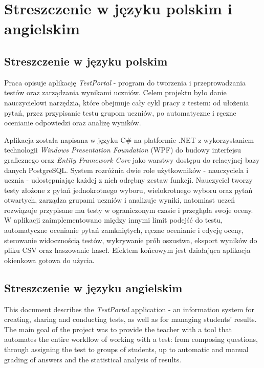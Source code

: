 ﻿\chapter{Streszczenie w języku polskim i angielskim}
\label{cha:streszczenie}

\section{Streszczenie w języku polskim}
\label{sec:streszczeniePL}

Praca opisuje aplikację \emph{TestPortal} - program do tworzenia i przeprowadzania testów oraz
zarządzania wynikami uczniów. Celem projektu było danie nauczycielowi narzędzia, które obejmuje cały
cykl pracy z testem: od ułożenia pytań, przez przypisanie testu grupom uczniów, po automatyczne
i ręczne ocenianie odpowiedzi oraz analizę wyników.

Aplikacja została napisana w języku C\# na platformie .NET z wykorzystaniem technologii
\emph{Windows Presentation Foundation} (WPF) do budowy interfejsu graficznego oraz \emph{Entity
Framework Core} jako warstwy dostępu do relacyjnej bazy danych PostgreSQL. System rozróżnia dwie
role użytkowników - nauczyciela i ucznia - udostępniając każdej z nich odrębny zestaw funkcji.
Nauczyciel tworzy testy złożone z pytań jednokrotnego wyboru, wielokrotnego wyboru oraz pytań
otwartych, zarządza grupami uczniów i analizuje wyniki, natomiast uczeń rozwiązuje przypisane mu
testy w ograniczonym czasie i przegląda swoje oceny. W aplikacji zaimplementowano między innymi
limit podejść do testu, automatyczne ocenianie pytań zamkniętych, ręczne ocenianie i edycję oceny,
sterowanie widocznością testów, wykrywanie prób oszustwa, eksport wyników do pliku CSV oraz
haszowanie haseł. Efektem końcowym jest działająca aplikacja okienkowa gotowa do użycia.

\section{Streszczenie w języku angielskim}
\label{sec:streszczenieEN}

This document describes the \emph{TestPortal} application - an information system for creating,
sharing and conducting tests, as well as for managing students' results. The main goal of the
project was to provide the teacher with a tool that automates the entire workflow of working with a
test: from composing questions, through assigning the test to groups of students, up to automatic
and manual grading of answers and the statistical analysis of results.

